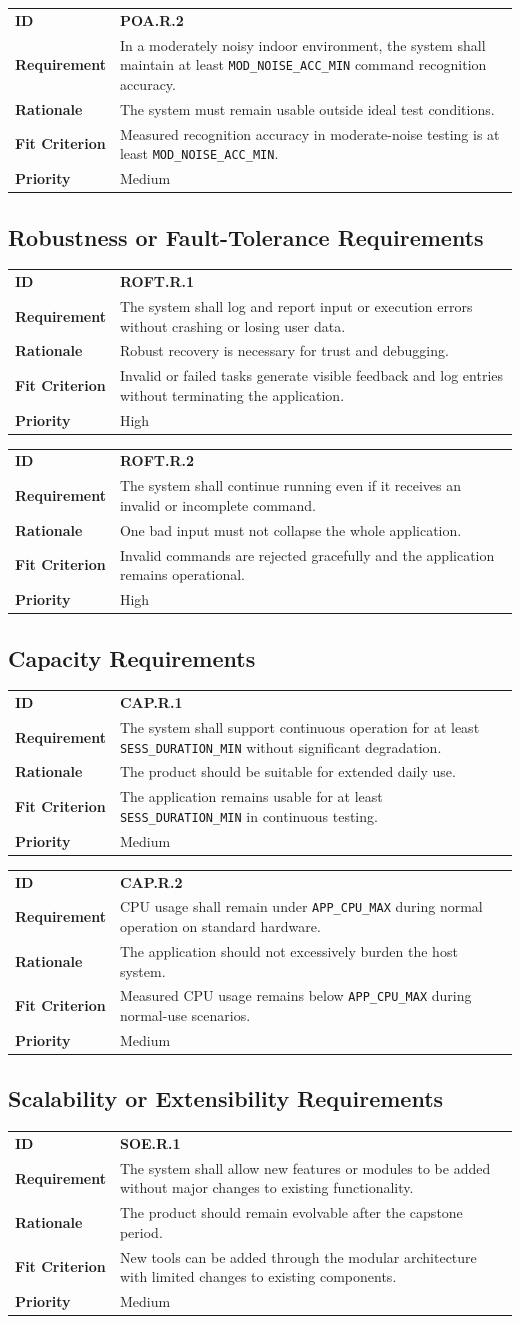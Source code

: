 \documentclass[12pt]{article}
\makeatletter
\newcommand{\reqcard}[5]{%
\noindent\begin{tabularx}{\textwidth}{@{}p{2.35cm}X@{}}
\textbf{ID} & \textbf{#1} \\
\textbf{Requirement} & #2 \\
\textbf{Rationale} & #3 \\
\textbf{Fit Criterion} & #4 \\
\textbf{Priority} & #5 \\
\end{tabularx}\par\medskip
}
\makeatother
\begin{document}
\reqcard{POA.R.2}{In a moderately noisy indoor environment, the
system shall maintain at least \texttt{MOD\_NOISE\_ACC\_MIN} command
recognition accuracy.}{The system must remain usable outside ideal
test conditions.}{Measured recognition accuracy in moderate-noise
testing is at least \texttt{MOD\_NOISE\_ACC\_MIN}.}{Medium}

\subsection{Robustness or Fault-Tolerance Requirements}
\reqcard{ROFT.R.1}{The system shall log and report input or execution
errors without crashing or losing user data.}{Robust recovery is
necessary for trust and debugging.}{Invalid or failed tasks generate
visible feedback and log entries without terminating the
application.}{High}

\reqcard{ROFT.R.2}{The system shall continue running even if it
receives an invalid or incomplete command.}{One bad input must not
collapse the whole application.}{Invalid commands are rejected
gracefully and the application remains operational.}{High}

\subsection{Capacity Requirements}
\reqcard{CAP.R.1}{The system shall support continuous operation for at
least \texttt{SESS\_DURATION\_MIN} without significant
degradation.}{The product should be suitable for extended daily
use.}{The application remains usable for at least
\texttt{SESS\_DURATION\_MIN} in continuous testing.}{Medium}

\reqcard{CAP.R.2}{CPU usage shall remain under
\texttt{APP\_CPU\_MAX} during normal operation on standard
hardware.}{The application should not excessively burden the host
system.}{Measured CPU usage remains below \texttt{APP\_CPU\_MAX}
during normal-use scenarios.}{Medium}

\subsection{Scalability or Extensibility Requirements}
\reqcard{SOE.R.1}{The system shall allow new features or modules to
be added without major changes to existing functionality.}{The product
should remain evolvable after the capstone period.}{New tools can be
added through the modular architecture with limited changes to
existing components.}{Medium}
\end{document}
